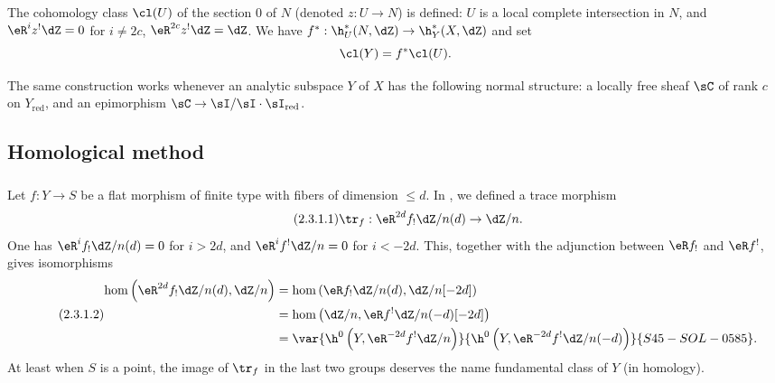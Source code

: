 The cohomology class $\cl(U)$ of the section $0$ of $N$ (denoted
$z:U\to N$) is defined: $U$ is a local complete intersection in $N$, and
$\eR^i z^!\dZ = 0$ for $i\ne 2 c$, $\eR^{2 c} z^!\dZ = \dZ$. We have
$f^*:\h_U^*(N,\dZ) \to \h_Y^*(X,\dZ)$ and set
\[
  \cl(Y) = f^*\cl(U) \text{.}
\]

The same construction works whenever an analytic subspace $Y$ of $X$ has
the following normal structure: a locally free sheaf $\sC$ of rank $c$ on
$Y_\text{red}$, and an epimorphism
$\sC\to \sI/\sI\cdot \sI_\text{red}$.










\subsection{Homological method}\label{IV:2-3}






\subsubsection{}\label{IV:2-3-1}

Let $f:Y\to S$ be a flat morphism of finite type with fibers of dimension
$\leqslant d$. In \cite[XVIII 2.9]{sga4}, we defined a trace morphism
\begin{equation*}\tag{2.3.1.1}\label{IV:eq:2-3-1-1}
  \tr_f:\eR^{2 d} f_! \dZ/n(d) \to \dZ/n \text{.}
\end{equation*}
One has $\eR^i f_!\dZ/n(d)=0$ for $i>2 d$, and
$\eR^i f^!\dZ/n=0$ for $i<-2 d$. This, together with the adjunction between
$\eR f_!$ and $\eR f^!$, gives isomorphisms
\begin{equation*}\tag{2.3.1.2}\label{IV:eq:2-3-1-2}
\begin{aligned}
  \hom\left(\eR^{2 d}f_!\dZ/n(d),\dZ/n\right)
    &= \hom\left(\eR f_!\dZ/n(d),\dZ/n[-2 d]\right) \\
    &= \hom\left(\dZ/n,\eR f^!\dZ/n(-d)[-2 d]\right) \\
    &= \var{\h^0\left(Y,\eR^{-2 d}f^!\dZ/n\right)}{\h^0\left(Y,\eR^{-2 d}f^!\dZ/n(-d)\right)}{S45-SOL-0585} \text{.}
\end{aligned}
\end{equation*}
At least when $S$ is a point, the image of $\tr_f$ in the last two groups
deserves the name fundamental class of $Y$ (in homology).

